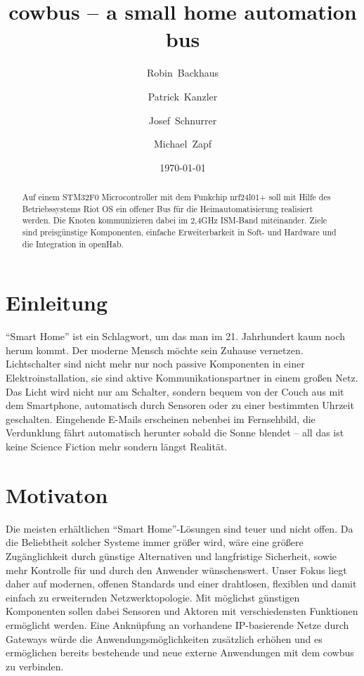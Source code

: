 \documentclass{IEEEtran}
\begin{document}
\title{cowbus -- a small home automation bus}
\author{Robin~Backhaus \and Patrick~Kanzler \and Josef~Schnurrer \and Michael~Zapf}
\date{\today}



\maketitle

\begin{abstract}
Auf einem STM32F0 Microcontroller mit dem Funkchip nrf24l01+ soll mit Hilfe des Betriebssystems Riot OS ein offener Bus für die Heimautomatisierung realisiert werden. Die Knoten kommunizieren dabei im 2,4GHz ISM-Band miteinander. Ziele sind preisgünstige Komponenten, einfache Erweiterbarkeit in Soft- und Hardware und die Integration in openHab.
\end{abstract}


\section{Einleitung}
    \enquote{Smart Home} ist ein Schlagwort, um das man im 21. Jahrhundert
    kaum noch herum kommt. Der moderne Mensch möchte sein Zuhause vernetzen.
    Lichtschalter sind nicht mehr nur noch passive Komponenten in einer
    Elektroinstallation, sie sind aktive Kommunikationspartner in einem großen Netz.
    Das Licht wird nicht nur am Schalter, sondern bequem von der Couch aus mit dem
    Smartphone, automatisch durch Sensoren oder zu einer bestimmten Uhrzeit geschalten. 
    Eingehende E-Mails erscheinen nebenbei im Fernsehbild, die Verdunklung fährt 
    automatisch herunter sobald die Sonne blendet --
    all das ist keine Science Fiction mehr sondern längst Realität.

\section{Motivaton}
    Die meisten erhältlichen \enquote{Smart Home}-Lösungen sind teuer und nicht offen.
    Da die Beliebtheit solcher Systeme immer größer wird, wäre eine größere 
    Zugänglichkeit durch günstige Alternativen und langfristige Sicherheit, 
    sowie mehr Kontrolle für und durch den Anwender wünschenswert.
    Unser Fokus liegt daher auf modernen, offenen Standards und einer drahtlosen, 
    flexiblen und damit einfach zu erweiternden Netzwerktopologie.
    Mit möglichst günstigen Komponenten sollen dabei Sensoren und Aktoren 
    mit verschiedensten Funktionen ermöglicht werden.
    Eine Anknüpfung an vorhandene IP-basierende Netze durch Gateways würde die 
    Anwendungsmöglichkeiten zusätzlich erhöhen 
    und es ermöglichen bereits bestehende und neue externe Anwendungen mit dem 
    cowbus zu verbinden.
\end{document}
